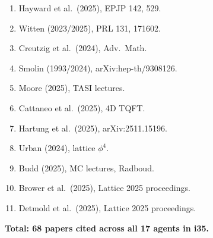 \documentclass[11pt,a4paper]{article}
\begin{document}
\begin{enumerate}
\item Hayward et al.\ (2025), EPJP 142, 529.
\item Witten (2023/2025), PRL 131, 171602.
\item Creutzig et al.\ (2024), Adv.\ Math.
\item Smolin (1993/2024), arXiv:hep-th/9308126.
\item Moore (2025), TASI lectures.
\item Cattaneo et al.\ (2025), 4D TQFT.
\item Hartung et al.\ (2025), arXiv:2511.15196.
\item Urban (2024), lattice $\phi^4$.
\item Budd (2025), MC lectures, Radboud.
\item Brower et al.\ (2025), Lattice 2025 proceedings.
\item Detmold et al.\ (2025), Lattice 2025 proceedings.
\end{enumerate}

\textbf{Total: 68 papers cited across all 17 agents in i35.}
\end{document}
